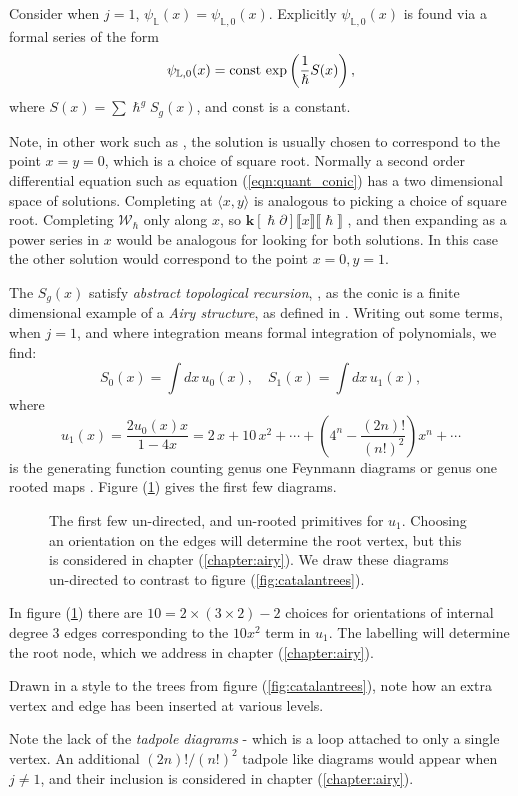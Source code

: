     Consider when \(j = 1\), \( \psi_{\mathbb{L}}(x)= \psi_{\mathbb{L},0}(x)\). Explicitly \( \psi_{\mathbb{L},0}(x)\) is found via a formal series of the form
    \[\psi_{\mathbb{L},0}(x) = \mathrm{const} \, \exp\left(\frac{1}{\hslash} S(x)\right),\]
    where \( S(x) = \sum \hslash^g S_g(x)\), and const is a constant. 
    \begin{rem} Note, in other work such as \cite{ks_airy}, the solution is usually chosen to correspond to the point \(x=y=0\), which is a choice of square root. Normally a second order differential equation such as equation (\ref{eqn:quant_conic}) has a two dimensional space of solutions. Completing at \( \langle x, y\rangle\) is analogous to picking a choice of square root. Completing \( \mathcal{W}_{\hslash}\) only along \(x\), so \( \mathbf{k}[\hslash \partial ] \lBrack x\rBrack \lBrack \hslash \rBrack\) , and then expanding as a power series in \(x\) would be analogous for looking for both solutions. In this case the other solution would correspond to the point \(x=0, y = 1\). 
    \end{rem}
    
    The \( S_g(x)\) satisfy \emph{abstract topological recursion}, \cite{ks_airy}, as the conic is a finite dimensional example of a  \emph{Airy structure}, as defined in \cite{ks_airy}. Writing out some terms, when \(j=1\), and where integration means formal integration of polynomials, we find: 
    \[ S_0(x) = \int dx\, u_0(x), \quad S_1(x) = \int dx\, u_1(x),\]
    where 
    \[u_1(x) =\frac{2 u_0(x)  x}{1 - 4 x} = 2 \, x + 10 \, x^2 + \cdots + \left(4^n - \frac{(2n)!}{(n!)^2}\right) x^n + \cdots \] is the generating function counting genus one Feynmann diagrams or genus one rooted maps \cite{feynmaps, walsh}. Figure (\ref{fig:u1}) gives the first few diagrams.
    
    \begin{figure}[htbp]
        \centering
        
        \caption{
        The first few un-directed, and un-rooted primitives for \(u_1\). Choosing an orientation on the edges will determine the root vertex, but this is considered in chapter (\ref{chapter:airy}). We draw these diagrams un-directed to contrast to figure (\ref{fig:catalantrees}).  
        }
        \label{fig:u1}
    \end{figure}

    \begin{rem}
        In figure (\ref{fig:u1}) there are \(10 = 2 \times ( 3 \times 2) - 2\) choices for orientations of internal degree \(3\) edges corresponding to the \(10 x^2\) term in \(u_1\). The labelling will determine the root node, which we address in chapter (\ref{chapter:airy}).
        
         Drawn in a style to the trees from figure (\ref{fig:catalantrees}), note how an extra vertex and edge has been inserted at various levels. 

         Note the lack of the \emph{tadpole diagrams} - which is a loop attached to only a single vertex. An additional \((2n)!/(n!)^2\) tadpole like diagrams would appear when \(j \neq 1\), and their inclusion is considered in chapter (\ref{chapter:airy}).
    \end{rem}
        
